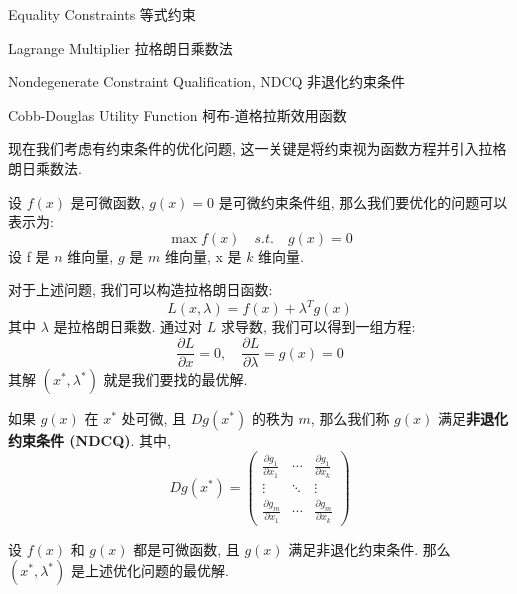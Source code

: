 \begin{introduction}[Keywords]
    \item Equality Constraints 等式约束
    \item Lagrange Multiplier 拉格朗日乘数法
    \item Nondegenerate Constraint Qualification, NDCQ 非退化约束条件
    \item Cobb-Douglas Utility Function 柯布-道格拉斯效用函数
\end{introduction}
\begin{note}
现在我们考虑有约束条件的优化问题, 这一关键是将约束视为函数方程并引入拉格朗日乘数法. 
\end{note}
\begin{definition}
    设 $f(x)$ 是可微函数, $g(x) = 0$ 是可微约束条件组, 那么我们要优化的问题可以表示为:
    \begin{equation}
        \max f(x) \quad s.t. \quad g(x) = 0
    \end{equation}
    设 f 是 $n$ 维向量, $g$ 是 $m$ 维向量, x 是 $k$ 维向量. 
\end{definition}
\begin{definition}
    对于上述问题, 我们可以构造拉格朗日函数:
    \begin{equation}
        L(x, \lambda) = f(x) + \lambda^T g(x)
    \end{equation}
    其中 $\lambda$ 是拉格朗日乘数.
    通过对 $L$ 求导数, 我们可以得到一组方程:
    \begin{equation}
        \frac{\partial L}{\partial x} = 0, \quad \frac{\partial L}{\partial \lambda} = g(x) = 0
    \end{equation}
    其解 $(x^*, \lambda^*)$ 就是我们要找的最优解.
\end{definition}
\begin{definition}[NDCQ]
    如果 $g(x)$ 在 $x^*$ 处可微, 且 $Dg(x^*)$ 的秩为 $m$, 那么我们称 $g(x)$ 满足\textbf{非退化约束条件 (NDCQ)}. 
    其中, $$Dg(x^*) = \begin{pmatrix}
        \frac{\partial g_1}{\partial x_1} & \cdots & \frac{\partial g_1}{\partial x_k} \\
        \vdots & \ddots & \vdots \\
        \frac{\partial g_m}{\partial x_1} & \cdots & \frac{\partial g_m}{\partial x_k}
    \end{pmatrix}$$
\end{definition}
\begin{theorem}
    设 $f(x)$ 和 $g(x)$ 都是可微函数, 且 $g(x)$ 满足非退化约束条件. 那么 $(x^*, \lambda^*)$ 是上述优化问题的最优解.
\end{theorem}
